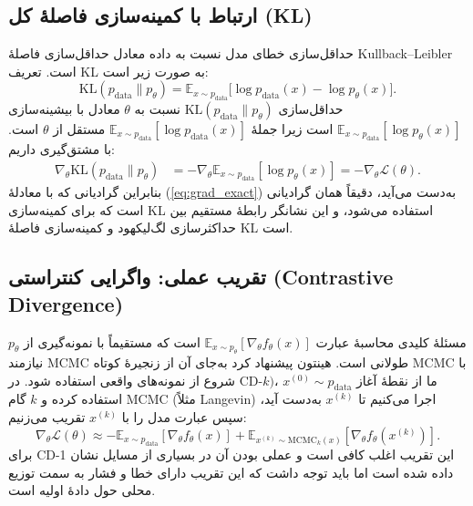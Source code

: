 \subsection{ارتباط با کمینه‌سازی فاصلهٔ کل (KL)}
حداقل‌سازی خطای مدل نسبت به داده معادل حداقل‌سازی فاصلهٔ Kullback–Leibler است. تعریف KL به صورت زیر است:
\begin{equation}
\mathrm{KL}(p_{\text{data}}\|p_{\theta}) = \mathbb{E}_{x\sim p_{\text{data}}}\big[\log p_{\text{data}}(x) - \log p_{\theta}(x)\big].
\end{equation}
حداقل‌سازی \(\mathrm{KL}(p_{\text{data}}\|p_{\theta})\) نسبت به \(\theta\) معادل با بیشینه‌سازی \(\mathbb{E}_{x\sim p_{\text{data}}}[\log p_{\theta}(x)]\) است زیرا جملهٔ \(\mathbb{E}_{x\sim p_{\text{data}}}[\log p_{\text{data}}(x)]\) مستقل از \(\theta\) است. با مشتق‌گیری داریم:
\begin{align}
\nabla_{\theta} \mathrm{KL}(p_{\text{data}}\|p_{\theta}) &= - \nabla_{\theta} \mathbb{E}_{x\sim p_{\text{data}}}[\log p_{\theta}(x)] = -\nabla_{\theta}\mathcal{L}(\theta).
\end{align}
بنابراین گرادیانی که با معادلهٔ (\ref{eq:grad_exact}) به‌دست می‌آید، دقیقاً همان گرادیانی است که برای کمینه‌سازی KL استفاده می‌شود، و این نشانگر رابطهٔ مستقیم بین حداکثر‌سازی لگ‌لیکهود و کمینه‌سازی فاصلهٔ KL است.

\subsection{تقریب عملی: واگرایی کنتراستی (Contrastive Divergence)}

مسئلهٔ کلیدی محاسبهٔ عبارت \(\mathbb{E}_{x\sim p_{\theta}}[\nabla_{\theta} f_{\theta}(x)]\) است که مستقیماً با نمونه‌گیری از \(p_{\theta}\) نیازمند MCMC طولانی است. هینتون پیشنهاد کرد به‌جای آن از زنجیرهٔ کوتاه MCMC با شروع از نمونه‌های واقعی استفاده شود. در CD-\(k)\)، ما از نقطهٔ آغاز \(x^{(0)}\sim p_{\text{data}}\) استفاده کرده و \(k\) گام MCMC (مثلاً Langevin) اجرا می‌کنیم تا \(x^{(k)}\) به‌دست آید، سپس عبارت مدل را با \(x^{(k)}\) تقریب می‌زنیم:
\begin{equation}
\nabla_{\theta} \mathcal{L}(\theta) \approx -\mathbb{E}_{x\sim p_{\text{data}}}[\nabla_{\theta} f_{\theta}(x)] + \mathbb{E}_{x^{(k)}\sim \text{MCMC}_k(x)}[\nabla_{\theta} f_{\theta}(x^{(k)})].
\end{equation}
برای CD-1 این تقریب اغلب کافی است و عملی بودن آن در بسیاری از مسایل نشان داده شده است اما باید توجه داشت که این تقریب دارای خطا و فشار به سمت توزیع محلی حول دادهٔ اولیه است.

